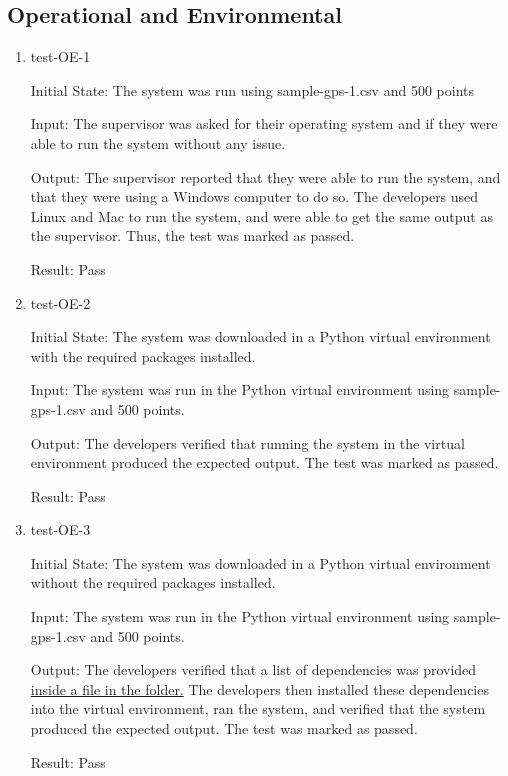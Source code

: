 \documentclass[12pt, titlepage]{article}
\begin{document}
\subsection{Operational and Environmental}
\begin{enumerate}
\item{test-OE-1} \label{test-OE-1}

Initial State: The system was run using sample-gps-1.csv and 500 points

Input: The supervisor was asked for their operating system and if they were able to run the system without any issue.

Output: The supervisor reported that they were able to run the system, and that they were using a Windows computer to do so. The developers used Linux and Mac to run the system, and were able to get the same output as the supervisor. Thus, the test was marked as passed.

Result: Pass

\item{test-OE-2} \label{test-OE-2}

Initial State: The system was downloaded in a Python virtual environment with the required packages installed.

Input: The system was run in the Python virtual environment using sample-gps-1.csv and 500 points.

Output: The developers verified that running the system in the virtual environment produced the expected output. The test was marked as passed.

Result: Pass

\item{test-OE-3} \label{test-OE-3}

Initial State: The system was downloaded in a Python virtual environment without the required packages installed.

Input: The system was run in the Python virtual environment using sample-gps-1.csv and 500 points.

Output: The developers verified that a list of dependencies was provided \href{https://github.com/paezha/PyERT-BLACK/blob/main/src/PyERT_environment.yaml}{inside a file in the folder.} The developers then installed these dependencies into the virtual environment, ran the system, and verified that the system produced the expected output. The test was marked as passed.

Result: Pass

\end{enumerate}	
\end{document}
